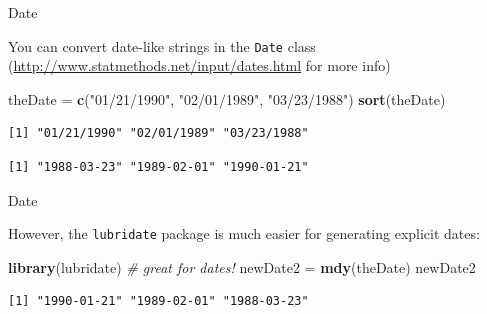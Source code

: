 \documentclass[
  ignorenonframetext,
]{beamer}
\newenvironment{Shaded}{\begin{snugshade}}{\end{snugshade}}
\newcommand{\CommentTok}[1]{\textcolor[rgb]{0.56,0.35,0.01}{\textit{#1}}}
\newcommand{\KeywordTok}[1]{\textcolor[rgb]{0.13,0.29,0.53}{\textbf{#1}}}
\newcommand{\NormalTok}[1]{#1}
\newcommand{\StringTok}[1]{\textcolor[rgb]{0.31,0.60,0.02}{#1}}
\begin{document}
\begin{frame}[fragile]{Date}
\protect\hypertarget{date}{}

You can convert date-like strings in the \texttt{Date} class
(\url{http://www.statmethods.net/input/dates.html} for more info)

\begin{Shaded}
\begin{Highlighting}[]
\NormalTok{theDate =}\StringTok{ }\KeywordTok{c}\NormalTok{(}\StringTok{"01/21/1990"}\NormalTok{, }\StringTok{"02/01/1989"}\NormalTok{, }\StringTok{"03/23/1988"}\NormalTok{)}
\KeywordTok{sort}\NormalTok{(theDate)}
\end{Highlighting}
\end{Shaded}

\begin{verbatim}
[1] "01/21/1990" "02/01/1989" "03/23/1988"
\end{verbatim}

\begin{Shaded}
\end{Shaded}

\begin{verbatim}
[1] "1988-03-23" "1989-02-01" "1990-01-21"
\end{verbatim}

\end{frame}

\begin{frame}[fragile]{Date}
\protect\hypertarget{date-1}{}

However, the \texttt{lubridate} package is much easier for generating
explicit dates:

\begin{Shaded}
\begin{Highlighting}[]
\KeywordTok{library}\NormalTok{(lubridate) }\CommentTok{# great for dates!}
\NormalTok{newDate2 =}\StringTok{ }\KeywordTok{mdy}\NormalTok{(theDate)}
\NormalTok{newDate2}
\end{Highlighting}
\end{Shaded}

\begin{verbatim}
[1] "1990-01-21" "1989-02-01" "1988-03-23"
\end{verbatim}

\end{frame}
\end{document}
